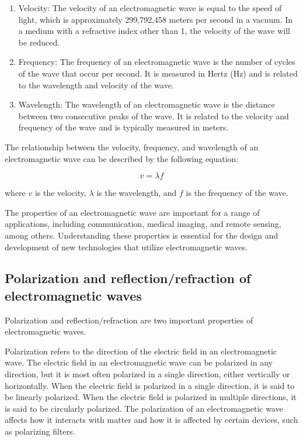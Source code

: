 \documentclass{article}
\begin{document}
\begin{enumerate}
\item Velocity: The velocity of an electromagnetic wave is equal to the speed
  of light, which is approximately 299,792,458 meters per second in a vacuum.
  In a medium with a refractive index other than 1, the velocity of the wave
  will be reduced.
\item Frequency: The frequency of an electromagnetic wave is the number of
  cycles of the wave that occur per second. It is measured in Hertz (Hz) and is
  related to the wavelength and velocity of the wave.
\item Wavelength: The wavelength of an electromagnetic wave is the distance
  between two consecutive peaks of the wave. It is related to the velocity and
  frequency of the wave and is typically measured in meters.
\end{enumerate}

The relationship between the velocity, frequency, and wavelength of an
electromagnetic wave can be described by the following equation:

\[v = \lambda f\]

where $v$ is the velocity, $\lambda$ is the wavelength, and $f$ is the frequency of the wave.

The properties of an electromagnetic wave are important for a range of
applications, including communication, medical imaging, and remote sensing,
among others. Understanding these properties is essential for the design and
development of new technologies that utilize electromagnetic waves.
\subsection{Polarization and reflection/refraction of electromagnetic waves}
Polarization and reflection/refraction are two important properties of
electromagnetic waves.

Polarization refers to the direction of the electric field in an
electromagnetic wave. The electric field in an electromagnetic wave can be
polarized in any direction, but it is most often polarized in a single
direction, either vertically or horizontally. When the electric field is
polarized in a single direction, it is said to be linearly polarized. When the
electric field is polarized in multiple directions, it is said to be circularly
polarized. The polarization of an electromagnetic wave affects how it interacts
with matter and how it is affected by certain devices, such as polarizing
filters.
\end{document}
